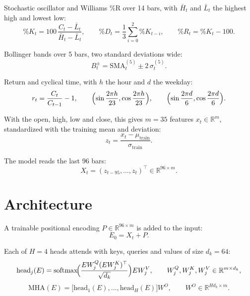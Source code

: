 \documentclass[11pt]{article}
\DeclareMathOperator{\softmax}{softmax}
\begin{document}
Stochastic oscillator and Williams \%R over 14 bars, with
$\bar H_t$ and $\bar L_t$ the highest high and lowest low:
\begin{equation}
  \%K_t = 100\, \frac{C_t - \bar L_t}{\bar H_t - \bar L_t}, \qquad
  \%D_t = \frac{1}{3} \sum_{i=0}^{2} \%K_{t-i}, \qquad
  \%R_t = \%K_t - 100.
\end{equation}

Bollinger bands over 5 bars, two standard deviations wide:
\begin{equation}
  B_t^{\pm} = \mathrm{SMA}_t^{(5)} \pm 2\, \sigma_t^{(5)}.
\end{equation}

Return and cyclical time, with $h$ the hour and $d$ the weekday:
\begin{equation}
  r_t = \frac{C_t}{C_{t-1}} - 1, \qquad
  \Bigl(\sin \frac{2\pi h}{23}, \cos \frac{2\pi h}{23}\Bigr), \qquad
  \Bigl(\sin \frac{2\pi d}{6}, \cos \frac{2\pi d}{6}\Bigr).
\end{equation}

With the open, high, low and close, this gives $m = 35$ features
$x_t \in \mathbb{R}^{m}$, standardized with the training mean and
deviation:
\begin{equation}
  z_t = \frac{x_t - \mu_{\text{train}}}{\sigma_{\text{train}}}.
\end{equation}

The model reads the last 96 bars:
\begin{equation}
  X_t = (z_{t-95}, \dots, z_t)^\top \in \mathbb{R}^{96 \times m}.
\end{equation}

\section{Architecture}

A trainable positional encoding $P \in \mathbb{R}^{96 \times m}$ is added
to the input:
\begin{equation}
  E_0 = X_t + P.
\end{equation}

Each of $H = 4$ heads attends with keys, queries and values of size
$d_k = 64$:
\begin{equation}
  \mathrm{head}_j(E) = \softmax\!\Bigl(\frac{E W_j^Q (E W_j^K)^\top}
    {\sqrt{d_k}}\Bigr) E W_j^V, \qquad
  W_j^Q, W_j^K, W_j^V \in \mathbb{R}^{m \times d_k},
\end{equation}
\begin{equation}
  \mathrm{MHA}(E) = \bigl[\mathrm{head}_1(E), \dots,
    \mathrm{head}_H(E)\bigr] W^O, \qquad
  W^O \in \mathbb{R}^{H d_k \times m}.
\end{equation}
\end{document}
